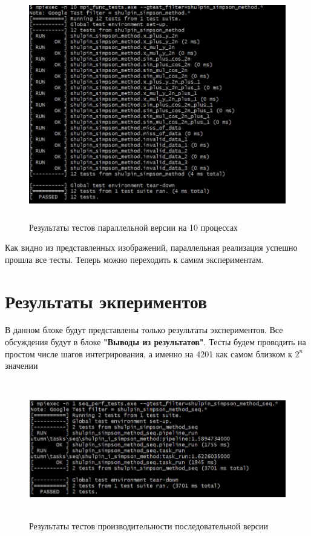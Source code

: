 \documentclass[12pt,a4paper]{article}
\begin{document}
\begin{figure}[H]
\centering
\includegraphics[height=10cm]{img/10nmpitest.jpg}
\caption{\label{fig:visualClass} Результаты тестов параллельной версии на 10 процессах}
\end{figure}

Как видно из представленных изображений, параллельная реализация успешно прошла все тесты. Теперь можно переходить к самим экспериментам.

\section*{Результаты экпериментов}

В данном блоке будут представлены только результаты экспериментов. Все обсуждения будут в блоке \textbf{"Выводы из результатов"}. Тесты будем проводить на простом числе шагов интегрирования, а именно на 4201 как самом близком к \(2^n\) значении

\begin{figure}[H]
\centering
\includegraphics[height=6cm]{img/1nseqperftest.jpg}
\caption{\label{fig:visualClass} Результаты тестов производительности последовательной версии}
\end{figure}
\end{document}
